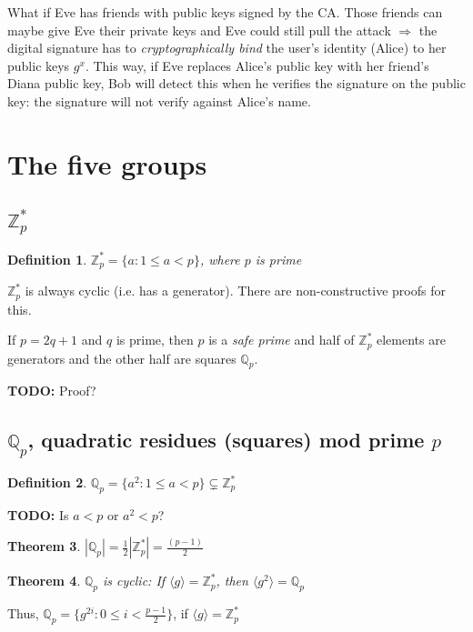 \documentclass[12pt]{article}
\newtheorem{thm}{Theorem}[section]
\newtheorem{definition}[thm]{Definition}
\newcommand{\Zp}{\mathbb{Z}^{\ast}_p}
\newcommand{\Qp}{\mathbb{Q}_p}
\newcommand{\gen}[1]{\langle #1 \rangle}
\newcommand{\todo}{\textbf{TODO:} }
\newcommand{\sz}[1]{\left|#1\right|}
\begin{document}
\begin{note}
What if Eve has friends with public keys signed by the CA. Those friends can maybe give Eve their private keys and Eve could still pull the attack $\Rightarrow$ the
digital signature has to \emph{cryptographically bind} the user's identity (Alice)
to her public keys $g^x$. This way, if Eve replaces Alice's public key with
her friend's Diana public key, Bob will detect this when he verifies the signature
on the public key: the signature will not verify against Alice's name.
\end{note}

\section{The five groups}

\subsection{$\Zp$}
\begin{definition}
$\Zp = \{ a : 1 \le a < p\}$, where $p$ is prime
\end{definition}

$\Zp$ is always cyclic (i.e. has a generator). There are non-constructive proofs
for this.

If $p = 2q + 1$ and $q$ is prime, then $p$ is a \emph{safe prime} and half of
$\Zp$ elements are generators and the other half are squares $\Qp$.

\todo Proof?

\subsection{$\Qp$, quadratic residues (squares) mod prime $p$}
\begin{definition}
$\Qp = \{a^2 : 1 \le a < p\} \subsetneq \Zp$
\end{definition}

\todo Is $a < p$ or $a^2 < p$?

\begin{thm}
$|\Qp| = \frac{1}{2}\sz{\Zp} = \frac{(p-1)}{2}$
\end{thm}

\begin{thm}
$\Qp$ is cyclic: If $\gen{g} = \Zp$, then $\gen{g^2} = \Qp$
\end{thm}

Thus, $\Qp = \{g^{2i} : 0 \le i < \frac{p-1}{2}\}$, if $\gen{g} = \Zp$
\end{document}
